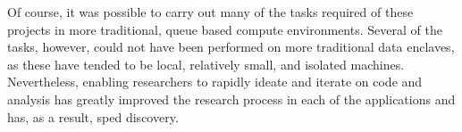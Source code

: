 Of course, it was possible to carry out many of the tasks required of these projects in more traditional, queue based compute environments. Several of the tasks, however, could not have been performed on more traditional data enclaves, as these have tended to be local, relatively small, and isolated machines. Nevertheless, enabling researchers to rapidly ideate and iterate on code and analysis has greatly improved the research process in each of the applications and has, as a result, sped discovery.